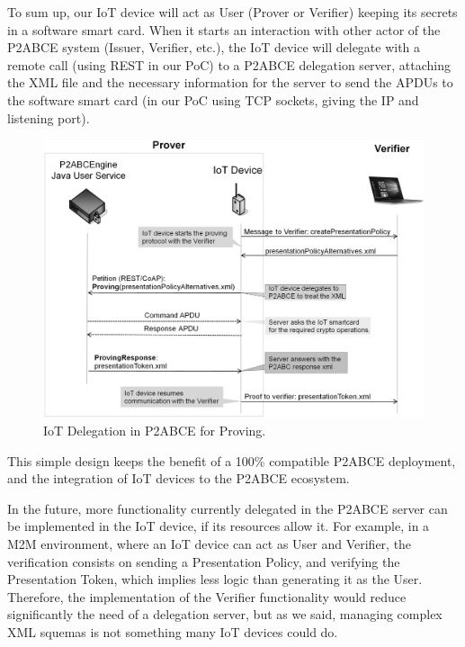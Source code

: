 \hfil




To sum up, our IoT device will act as User (Prover or Verifier) keeping its secrets in a software smart card. When it starts an interaction with other actor of the P2ABCE system (Issuer, Verifier, etc.), the IoT device will delegate with a remote call (using REST in our PoC) to a P2ABCE delegation server, attaching the XML file and the necessary information for the server to send the APDUs to the software smart card (in our PoC using TCP sockets, giving the IP and listening port).



\begin{figure}[bth]
	\begin{center}
		\includegraphics[width=\linewidth]{gfx/DelegationProving}
	\end{center}
	\caption{IoT Delegation in P2ABCE for Proving.}
	\label{fig:DelegationProving}
\end{figure}


\hfil


This simple design keeps the benefit of a 100\% compatible P2ABCE deployment, and the integration of IoT devices to the P2ABCE ecosystem.

In the future, more functionality currently delegated in the P2ABCE server can be implemented in the IoT device, if its resources allow it. For example, in a M2M environment, where an IoT device can act as User and Verifier, the verification consists on sending a Presentation Policy, and verifying the Presentation Token, which implies less logic than generating it as the User. Therefore, the implementation of the Verifier functionality would reduce significantly the need of a delegation server, but as we said, managing complex XML squemas is not something many IoT devices could do.




